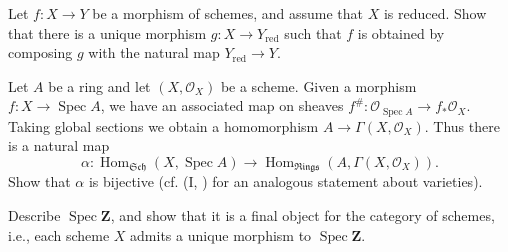 {{{\noindent\hypertarget{ex-II-2.3c}{}Let $f\colon X\to Y$ be a morphism of schemes, and assume that $X$ is reduced. Show that there is a unique morphism $g\colon X\to Y_{\mathrm{red}}$ such that $f$ is obtained by composing $g$ with the natural map $Y_{\mathrm{red}}\to Y$.\par}

\smallskip
\noindent\hypertarget{ex-II-2.4}{}Let $A$ be a ring and let $(X,\mathcal O_X)$ be a scheme. Given a morphism $f\colon X\to\operatorname{Spec}A$, we have an associated map on sheaves $f^\#\colon\mathcal O_{\operatorname{Spec}A}\to f_*\mathcal O_X$. Taking global sections we obtain a homomorphism $A\to\Gamma(X,\mathcal O_X)$. Thus there is a natural map
\[
\alpha\colon\operatorname{Hom}_{\mathfrak{Sch}}(X,\operatorname{Spec}A)\to\operatorname{Hom}_{\mathfrak{Rings}}(A,\Gamma(X,\mathcal O_X)).
\]
Show that $\alpha$ is bijective (cf. (I, ) for an analogous statement about varieties).

\smallskip
\noindent\hypertarget{ex-II-2.5}{}Describe $\operatorname{Spec}\mathbf Z$, and show that it is a final object for the category of schemes, i.e., each scheme $X$ admits a unique morphism to $\operatorname{Spec}\mathbf Z$.\par}
}
